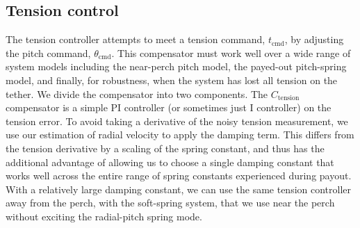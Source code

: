 \documentclass[11pt]{amsart}
\begin{document}
\subsection{Tension control}

The tension controller attempts to meet a tension command,
$t_{\mathrm{cmd}}$, by adjusting the pitch command,
$\theta_{\mathrm{cmd}}$.  This compensator must work well over a wide
range of system models including the near-perch pitch model, the
payed-out pitch-spring model, and finally, for robustness, when the
system has lost all tension on the tether.  We divide the compensator
into two components.  The $C_{\mathrm{tension}}$ compensator is a
simple PI controller (or sometimes just I controller) on the tension
error.  To avoid taking a derivative of the noisy tension measurement,
we use our estimation of radial velocity to apply the damping term.
This differs from the tension derivative by a scaling of the spring
constant, and thus has the additional advantage of allowing us to
choose a single damping constant that works well across the entire
range of spring constants experienced during payout.  With a
relatively large damping constant, we can use the same tension
controller away from the perch, with the soft-spring system, that we
use near the perch without exciting the radial-pitch spring mode.
\end{document}
